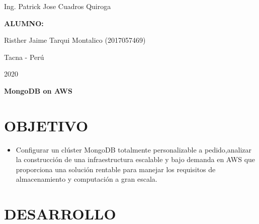 \documentclass[12pt,letterpaper]{article}
\begin{document}
\begin{titlepage}
\begin{center}
\begin{Large}
			\end{Large}
			\vspace*{0.1in}
			\begin{large}
				Ing. Patrick Jose Cuadros Quiroga\\
			\end{large}
			\vspace*{0.3in}
			\begin{large}
				\textbf{ALUMNO:} \\
				\begin{flushleft}
					Risther Jaime Tarqui Montalico  		\hfill	(2017057469) \\
				\end{flushleft}
			\end{large}
			\vspace*{1.3in}
			\begin{large}
				Tacna - Perú\\
			\end{large}
			\vspace*{0.1in}
			\begin{large}
				2020\\
			\end{large}
		\end{center}
	\end{titlepage}
	
	\newpage
	
	\justify
	
	\begin{LARGE}
		\begin{center}
			\textbf{MongoDB on AWS} \\
		\end{center}
	\end{LARGE}
	\section{OBJETIVO}
	\begin{itemize}
		\item Configurar un clúster MongoDB totalmente personalizable a pedido,analizar la construcción de una infraestructura escalable y bajo demanda en AWS que proporciona una solución rentable para manejar los requisitos de almacenamiento y computación a gran escala. 
	\end{itemize}
	
	\section{DESARROLLO}
\end{document}
